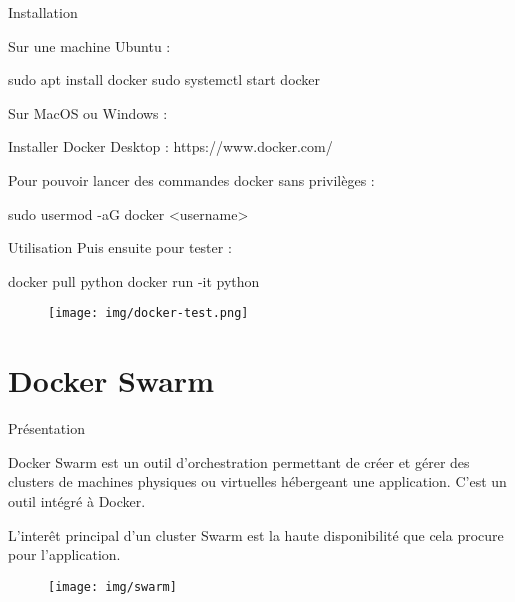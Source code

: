 \documentclass{cubeamer}
\begin{document}
\begin{frame}[fragile]{Installation}
    \begin{multicols}{2}
Sur une machine Ubuntu :
\begin{bashResized}{0.48}
sudo apt install docker
sudo systemctl start docker
\end{bashResized}
    \columnbreak
    
Sur MacOS ou Windows :
\begin{bashResized}{0.48}
Installer Docker Desktop :
https://www.docker.com/
\end{bashResized}
    \end{multicols}

    Pour pouvoir lancer des commandes docker sans privilèges :
\begin{bash}
sudo usermod -aG docker <username>
\end{bash}
\end{frame}

\begin{frame}[fragile]{Utilisation}
    Puis ensuite pour tester :
\begin{bash}
docker pull python
docker run -it python
\end{bash}

    \begin{figure}
        \centering
        \texttt{[image: img/docker-test.png]}
    \end{figure}
\end{frame}

\section{Docker Swarm}

\begin{frame}{Présentation}
    \begin{multicols}{2}
    Docker Swarm est un outil d'orchestration permettant de créer et gérer des clusters de
    machines physiques ou virtuelles hébergeant une application. C'est un outil intégré à Docker.

    L'interêt principal d'un cluster Swarm est la haute disponibilité que cela procure pour
    l'application.

    \columnbreak
    \begin{figure}
        \centering
        \texttt{[image: img/swarm]}
    \end{figure}

    \end{multicols}
\end{frame}
\end{document}
